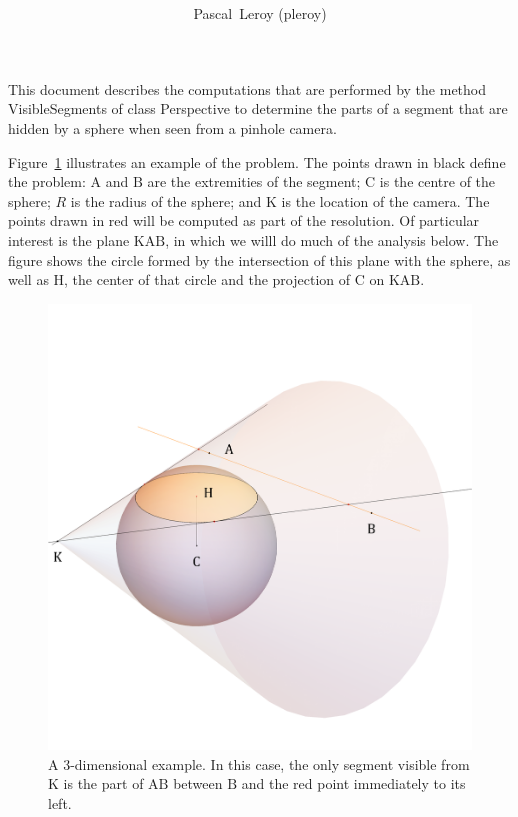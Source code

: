 \documentclass[10pt, a4paper, twoside]{basestyle}
\title{%
\textdisplay{%
Hiding Computations in Projection%
}%
}
\author{Pascal~Leroy (pleroy)}
\newcommand{\point}[1]{\mathrm{#1}}
\newcommand{\straightline}[2]{\point #1 \point #2}
\newcommand{\plane}[3]{\point #1 \point #2 \point #3}
\begin{document}
\maketitle
This document describes the computations that are performed by the method
VisibleSegments of class Perspective to determine the parts of a segment that
are hidden by a sphere when seen from a pinhole camera.

Figure~\ref{fig3d} illustrates an example of the problem.  The points drawn in
black define the problem: $\point A$ and $\point B$ are the extremities of the
segment; $\point C$ is the centre of the sphere; $R$ is the radius of the
sphere; and $\point K$ is the location of the camera.  The points drawn in red
will be computed as part of the resolution.  Of particular interest is the plane
$\plane KAB$, in which we willl do much of the analysis below.  The figure shows
the circle formed by the intersection of this plane with the sphere, as well as
$\point H$, the center of that circle and the projection of $\point C$ on
$\plane KAB$.
\begin{figure}[htb!]
\centering
\includegraphics[scale=0.35]{Perspective-hiding-3d}
\caption{A 3-dimensional example.  In this case, the only segment visible from
$\point K$ is the part of $\straightline AB$ between $\point B$ and the red
point immediately to its left.\label{fig3d}}
\end{figure}
\end{document}
